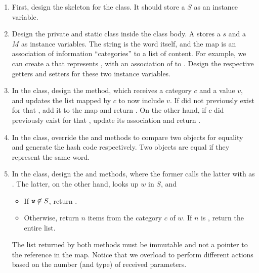 
\begin{enumerate}[label=(\alph*)]
    \item First, design the skeleton for the  class. It should store a  $S$ as an instance variable.
    \item Design the private and static  class inside the  class body. A  stores a  $s$ and a  $M$ as instance variables. The string is the word itself, and the map is an association of information ``categories'' to a list of content. For example, we can create a  that represents , with an association of  to . Design the respective getters and setters for these two instance variables.
    \item In the  class, design the  method, which receives a category $c$ and a value $v$, and updates the list mapped by $c$ to now include $v$. If  did not previously exist for that , add it to the map and return . On the other hand, if $c$ did previously exist for that , update its association and return .
    \item In the  class, override the  and  methods to compare two  objects for equality and generate the hash code respectively. Two  objects are equal if they represent the same word.
    \item In the  class, design the  and  methods, where the former calls the latter with  as . The latter, on the other hand, looks up $w$ in $S$, and
    \begin{itemize}
        \item If $\ttt{w}\not\in{S}$, return .
        \item Otherwise, return $n$ items from the category $c$ of $w$. If $n$ is , return the entire list.
    \end{itemize}
    The list returned by both methods must be immutable and not a pointer to the reference in the map. Notice that we overload  to perform different actions based on the number (and type) of received parameters.
\end{enumerate}